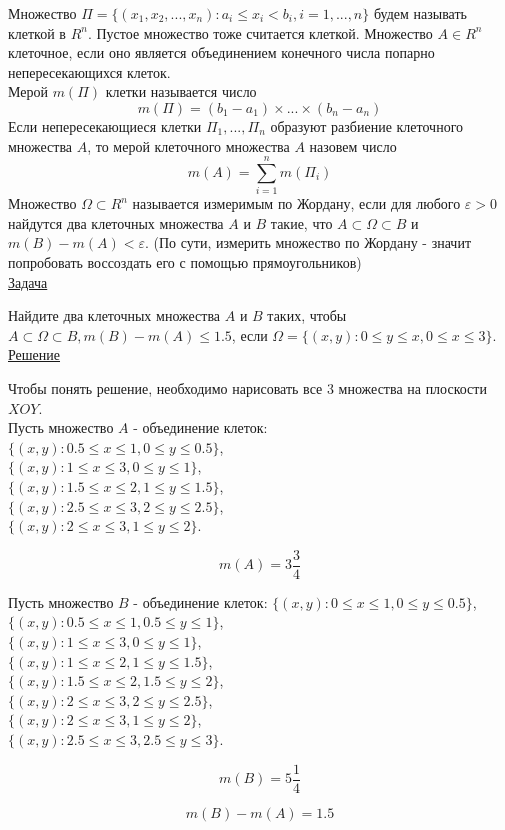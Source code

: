 \documentclass{report}
\begin{document}
Множество $\Pi = \{(x_{1}, x_{2}, ... , x_{n}): a_{i} \leq x_{i} < b_{i}, i = 1, ... , n\}$ будем называть клеткой в $R^{n}$. Пустое множество тоже считается клеткой. Множество $A\in R^{n}$ клеточное, если оно является объединением конечного числа попарно непересекающихся клеток. \\
Мерой $m(\Pi)$ клетки называется число
\[m(\Pi) = (b_{1} - a_{1})\times...\times(b_{n} - a_{n})\]
Если непересекающиеся клетки $\Pi_{1}, ..., \Pi_{n}$ образуют разбиение клеточного множества $A$, то мерой клеточного множества $A$ назовем число
\[m(A) = \sum_{i = 1}^{n} m(\Pi_{i})\]
Множество $\Omega\subset R^{n}$ называется измеримым по Жордану, если для любого $\varepsilon > 0$ найдутся два клеточных множества $A$ и $B$ такие, что $A\subset\Omega\subset B$ и $m(B) - m(A) <\varepsilon$. (По сути, измерить множество по Жордану - значит попробовать воссоздать его с помощью прямоугольников)\\

\underline{Задача}

Найдите два клеточных множества $A$ и $B$ таких, чтобы $A\subset\Omega\subset B, m(B) - m(A) \leq 1.5$, если $\Omega = \{(x,y): 0\leq y \leq x, 0 \leq x \leq 3\}$.\\

\underline{Решение}

Чтобы понять решение, необходимо нарисовать все 3 множества на плоскости $XOY$.\\

Пусть множество $A$ - объединение клеток:\\
$\{(x, y): 0.5 \leq x \leq 1, 0 \leq y \leq 0.5\}$,\\
$\{(x, y): 1 \leq x \leq 3, 0 \leq y \leq 1\}$,\\
$\{(x, y): 1.5 \leq x \leq 2, 1 \leq y \leq 1.5\}$,\\
$\{(x, y): 2.5 \leq x \leq 3, 2 \leq y \leq 2.5\}$,\\
$\{(x, y): 2 \leq x \leq 3, 1 \leq y \leq 2\}$.

\[m(A) = 3\frac{3}{4}\]

Пусть множество $B$ - объединение клеток:
$\{(x, y): 0 \leq x \leq 1, 0 \leq y \leq 0.5\}$,\\
$\{(x, y): 0.5 \leq x \leq 1, 0.5 \leq y \leq 1\}$,\\
$\{(x, y): 1 \leq x \leq 3, 0 \leq y \leq 1\}$,\\
$\{(x, y): 1 \leq x \leq 2, 1 \leq y \leq 1.5\}$,\\
$\{(x, y): 1.5 \leq x \leq 2, 1.5 \leq y \leq 2\}$,\\
$\{(x, y): 2 \leq x \leq 3, 2 \leq y \leq 2.5\}$,\\
$\{(x, y): 2 \leq x \leq 3, 1 \leq y \leq 2\}$,\\
$\{(x, y): 2.5 \leq x \leq 3, 2.5 \leq y \leq 3\}$.

\[m(B) = 5\frac{1}{4}\]

\[m(B) - m(A) = 1.5\]
\newpage
\end{document}
